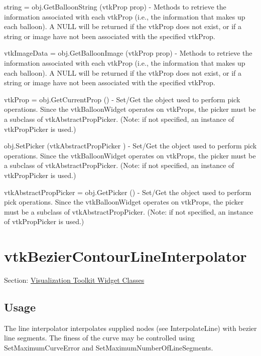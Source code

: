 \begin{DoxyItemize}
\item {\ttfamily string = obj.\-Get\-Balloon\-String (vtk\-Prop prop)} -\/ Methods to retrieve the information associated with each vtk\-Prop (i.\-e., the information that makes up each balloon). A N\-U\-L\-L will be returned if the vtk\-Prop does not exist, or if a string or image have not been associated with the specified vtk\-Prop.  
\item {\ttfamily vtk\-Image\-Data = obj.\-Get\-Balloon\-Image (vtk\-Prop prop)} -\/ Methods to retrieve the information associated with each vtk\-Prop (i.\-e., the information that makes up each balloon). A N\-U\-L\-L will be returned if the vtk\-Prop does not exist, or if a string or image have not been associated with the specified vtk\-Prop.  
\item {\ttfamily vtk\-Prop = obj.\-Get\-Current\-Prop ()} -\/ Set/\-Get the object used to perform pick operations. Since the vtk\-Balloon\-Widget operates on vtk\-Props, the picker must be a subclass of vtk\-Abstract\-Prop\-Picker. (Note\-: if not specified, an instance of vtk\-Prop\-Picker is used.)  
\item {\ttfamily obj.\-Set\-Picker (vtk\-Abstract\-Prop\-Picker )} -\/ Set/\-Get the object used to perform pick operations. Since the vtk\-Balloon\-Widget operates on vtk\-Props, the picker must be a subclass of vtk\-Abstract\-Prop\-Picker. (Note\-: if not specified, an instance of vtk\-Prop\-Picker is used.)  
\item {\ttfamily vtk\-Abstract\-Prop\-Picker = obj.\-Get\-Picker ()} -\/ Set/\-Get the object used to perform pick operations. Since the vtk\-Balloon\-Widget operates on vtk\-Props, the picker must be a subclass of vtk\-Abstract\-Prop\-Picker. (Note\-: if not specified, an instance of vtk\-Prop\-Picker is used.)  
\end{DoxyItemize}\hypertarget{vtkwidgets_vtkbeziercontourlineinterpolator}{}\section{vtk\-Bezier\-Contour\-Line\-Interpolator}\label{vtkwidgets_vtkbeziercontourlineinterpolator}
Section\-: \hyperlink{sec_vtkwidgets}{Visualization Toolkit Widget Classes} \hypertarget{vtkwidgets_vtkxyplotwidget_Usage}{}\subsection{Usage}\label{vtkwidgets_vtkxyplotwidget_Usage}
The line interpolator interpolates supplied nodes (see Interpolate\-Line) with bezier line segments. The finess of the curve may be controlled using Set\-Maximum\-Curve\-Error and Set\-Maximum\-Number\-Of\-Line\-Segments.

